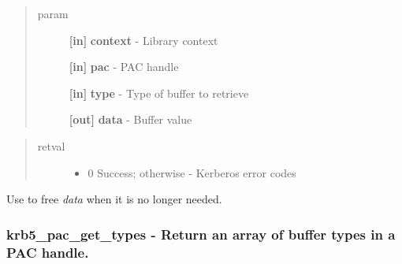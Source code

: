 \documentclass[letterpaper,10pt,english]{sphinxmanual}
\begin{document}
\begin{quote}\begin{description}
\item[{param}] \leavevmode
\textbf{{[}in{]}} \textbf{context} - Library context

\textbf{{[}in{]}} \textbf{pac} - PAC handle

\textbf{{[}in{]}} \textbf{type} - Type of buffer to retrieve

\textbf{{[}out{]}} \textbf{data} - Buffer value

\end{description}\end{quote}
\begin{quote}\begin{description}
\item[{retval}] \leavevmode\begin{itemize}
\item {} 
0   Success; otherwise - Kerberos error codes

\end{itemize}

\end{description}\end{quote}

Use {\hyperref[appdev/refs/api/krb5_free_data_contents:c.krb5_free_data_contents]{}} to free \emph{data} when it is no longer needed.


\subsubsection{krb5\_pac\_get\_types -  Return an array of buffer types in a PAC handle.}
\label{appdev/refs/api/krb5_pac_get_types:krb5-pac-get-types-return-an-array-of-buffer-types-in-a-pac-handle}\label{appdev/refs/api/krb5_pac_get_types::doc}

\begin{fulllineitems}
\label{appdev/refs/api/krb5_pac_get_types:c.krb5_pac_get_types}
\end{fulllineitems}
\end{document}
